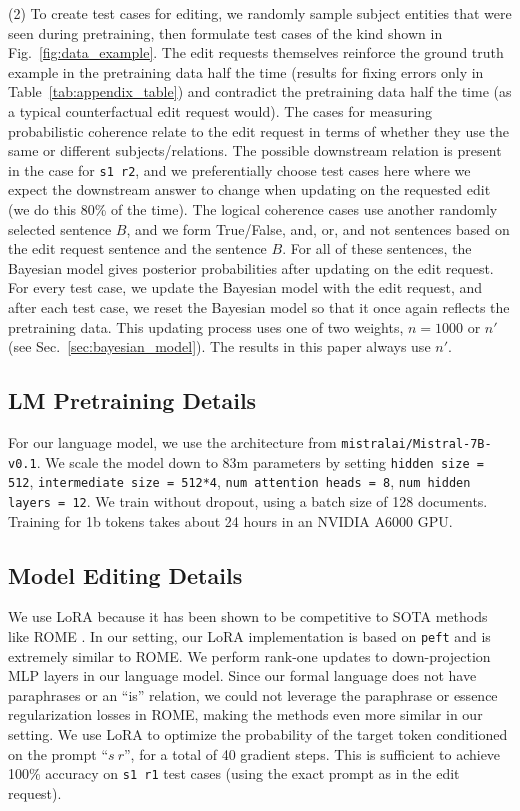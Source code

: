 \documentclass[11pt,a4paper]{article}
\begin{document}
(2) To create test cases for editing, we randomly sample subject entities that were seen during pretraining, then formulate test cases of the kind shown in Fig.~\ref{fig:data_example}. The edit requests themselves reinforce the ground truth example in the pretraining data half the time (results for fixing errors only in Table~\ref{tab:appendix_table}) and contradict the pretraining data half the time (as a typical counterfactual edit request would). The cases for measuring probabilistic coherence relate to the edit request in terms of whether they use the same or different subjects/relations. The possible downstream relation is present in the case for \texttt{s1 \hspace{-7pt} r2}, and we preferentially choose test cases here where we expect the downstream answer to change when updating on the requested edit (we do this 80\% of the time). The logical coherence cases use another randomly selected sentence $B$, and we form True/False, and, or, and not sentences based on the edit request sentence and the sentence $B$. For all of these sentences, the Bayesian model gives posterior probabilities after updating on the edit request. For every test case, we update the Bayesian model with the edit request, and after each test case, we reset the Bayesian model so that it once again reflects the pretraining data. This updating process uses one of two weights, $n=1000$ or $n'$ (see Sec.~\ref{sec:bayesian_model}). The results in this paper always use $n'$. 

\subsection{LM Pretraining Details}

For our language model, we use the architecture from \texttt{mistralai/Mistral-7B-v0.1}. We scale the model down to 83m parameters by setting \texttt{hidden size = 512}, 
            \texttt{intermediate size = 512*4}, 
            \texttt{num attention heads = 8}, 
            \texttt{num hidden layers  = 12}. We train without dropout, using a batch size of 128 documents. Training for 1b tokens takes about 24 hours in an NVIDIA A6000 GPU. 

\subsection{Model Editing Details}

We use LoRA because it has been shown to be competitive to SOTA methods like ROME \citep{hua2024propagation, gangadhar2024model}. In our setting, our LoRA implementation is based on \texttt{peft} \citep{peft} and is extremely similar to ROME. We perform rank-one updates to down-projection MLP layers in our language model. Since our formal language does not have paraphrases or an ``is'' relation, we could not leverage the paraphrase or essence regularization losses in ROME, making the methods even more similar in our setting. We use LoRA to optimize the probability of the target token conditioned on the prompt ``$s \ r$'', for a total of 40 gradient steps. This is sufficient to achieve 100\% accuracy on \texttt{s1 \hspace{-5pt} r1} test cases (using the exact prompt as in the edit request). 
\end{document}
